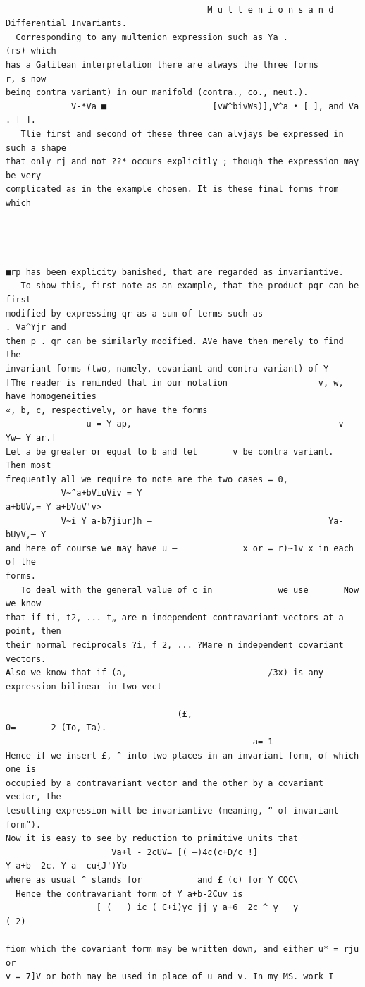 \documentclass[10pt]{article}
\begin{document}
\clearpage
\begin{verbatim}

                                        M u l t e n i o n s a n d Differential Invariants.
  Corresponding to any multenion expression such as Ya .                    (rs) which
has a Galilean interpretation there are always the three forms                 r, s now
being contra variant) in our manifold (contra., co., neut.).
             V-*Va ■                     [vW^bivWs)],V^a • [ ], and Va . [ ].
   Tlie first and second of these three can alvjays be expressed in such a shape
that only rj and not ??* occurs explicitly ; though the expression may be very
complicated as in the example chosen. It is these final forms from which




■rp has been explicity banished, that are regarded as invariantive.
   To show this, first note as an example, that the product pqr can be first
modified by expressing qr as a sum of terms such as                        . Va^Yjr and
then p . qr can be similarly modified. AVe have then merely to find the
invariant forms (two, namely, covariant and contra variant) of Y
[The reader is reminded that in our notation                  v, w, have homogeneities
«, b, c, respectively, or have the forms
                u = Y ap,                                         v—        Yw— Y ar.]
Let a be greater or equal to b and let       v be contra variant.         Then most
frequently all we require to note are the two cases = 0,
           V~^a+bViuViv = Y                                      a+bUV,= Y a+bVuV'v>
           V~i Y a-b7jiur)h —                                   Ya-bUyV,— Y
and here of course we may have u —             x or = r)~1v x in each of the
forms.
   To deal with the general value of c in             we use       Now we know
that if ti, t2, ... t„ are n independent contravariant vectors at a point, then
their normal reciprocals ?i, f 2, ... ?Mare n independent covariant vectors.
Also we know that if (a,                            /3x) is any expression—bilinear in two vect

                                  (£,                                0= -     2 (To, Ta).
                                                 a= 1
Hence if we insert £, ^ into two places in an invariant form, of which one is
occupied by a contravariant vector and the other by a covariant vector, the
lesulting expression will be invariantive (meaning, “ of invariant form”).
Now it is easy to see by reduction to primitive units that
                     Va+l - 2cUV= [( —)4c(c+D/c !]                               Y a+b- 2c. Y a- cu{J')Yb
where as usual ^ stands for           and £ (c) for Y CQC\
  Hence the contravariant form of Y a+b-2Cuv is
                  [ ( _ ) ic ( C+i)yc jj y a+6_ 2c ^ y   y                        ( 2)

fiom which the covariant form may be written down, and either u* = rju or
v = 7]V or both may be used in place of u and v. In my MS. work I


\end{verbatim}
\end{document}
